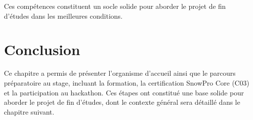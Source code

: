 Ces compétences constituent un socle solide pour aborder le projet de fin d'études dans les meilleures conditions.

\section{Conclusion}
Ce chapitre a permis de présenter l'organisme d'accueil ainsi que le parcours préparatoire au stage, incluant la formation, la certification SnowPro Core (C03) et la participation au hackathon. Ces étapes ont constitué une base solide pour aborder le projet de fin d'études, dont le contexte général sera détaillé dans le chapitre suivant.
